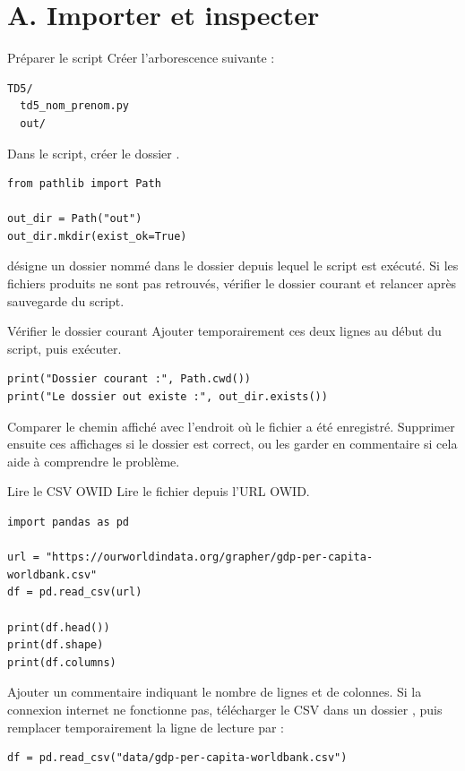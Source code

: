 \documentclass[11pt,a4paper]{article}
\begin{document}
\section*{A. Importer et inspecter}

\begin{mandatoryexercise}{Préparer le script}
Créer l'arborescence suivante :
\begin{lstlisting}[language=terminal]
TD5/
  td5_nom_prenom.py
  out/
\end{lstlisting}
Dans le script, créer le dossier .
\begin{lstlisting}
from pathlib import Path

out_dir = Path("out")
out_dir.mkdir(exist_ok=True)
\end{lstlisting}
 désigne un dossier nommé  dans le dossier depuis lequel le script est exécuté. Si les fichiers produits ne sont pas retrouvés, vérifier le dossier courant et relancer après sauvegarde du script.
\end{mandatoryexercise}

\begin{mandatoryexercise}{Vérifier le dossier courant}
Ajouter temporairement ces deux lignes au début du script, puis exécuter.
\begin{lstlisting}
print("Dossier courant :", Path.cwd())
print("Le dossier out existe :", out_dir.exists())
\end{lstlisting}
Comparer le chemin affiché avec l'endroit où le fichier  a été enregistré. Supprimer ensuite ces affichages si le dossier est correct, ou les garder en commentaire si cela aide à comprendre le problème.
\end{mandatoryexercise}

\begin{mandatoryexercise}{Lire le CSV OWID}
Lire le fichier depuis l'URL OWID.
\begin{lstlisting}
import pandas as pd

url = "https://ourworldindata.org/grapher/gdp-per-capita-worldbank.csv"
df = pd.read_csv(url)

print(df.head())
print(df.shape)
print(df.columns)
\end{lstlisting}
Ajouter un commentaire indiquant le nombre de lignes et de colonnes.
Si la connexion internet ne fonctionne pas, télécharger le CSV dans un dossier , puis remplacer temporairement la ligne de lecture par :
\begin{lstlisting}
df = pd.read_csv("data/gdp-per-capita-worldbank.csv")
\end{lstlisting}
\end{mandatoryexercise}
\end{document}
